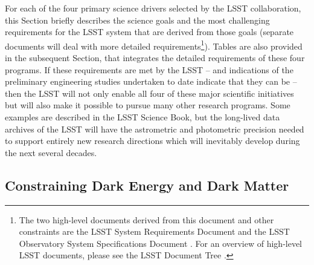 For each of the four primary science drivers selected by the LSST collaboration,
this Section briefly describes the science goals and the most challenging
requirements for the LSST system that are derived from those goals (separate
documents will deal with more detailed requirements\footnote{The two
high-level documents derived from this document and other constraints are the
LSST System Requirements Document  and the LSST Observatory System
Specifications Document . For an overview of high-level LSST documents,
please see the LSST Document Tree .}).
Tables are also provided in the subsequent Section, that
integrates the detailed requirements of these four programs. If these
requirements are met by the LSST -- and indications of the preliminary
engineering studies undertaken to date indicate that they can be -- then
the LSST will not only enable all four of these major scientific
initiatives but will also make it possible to pursue many other research
programs. Some examples are described in the LSST Science Book,
but the long-lived
data archives of the LSST will have the astrometric and photometric
precision needed to support entirely new research directions which will
inevitably develop during the next several decades.



\subsection{Constraining Dark Energy and Dark Matter \label{sec:DE}}

